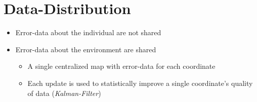 \section{Data-Distribution}
\begin{itemize}
	\item{Error-data about the individual are not shared}
	\item{Error-data about the environment are shared}
	\begin{itemize}
		\item{A single centralized map with error-data for each coordinate}
		\item{Each update is used to statistically improve a single coordinate's quality of data (\emph{Kalman-Filter})}
	\end{itemize}
\end{itemize}
